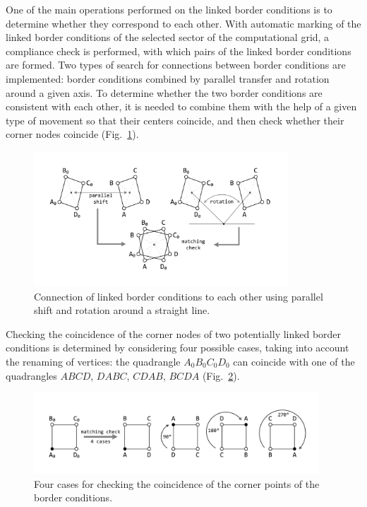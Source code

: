\documentclass[
11pt,%
tightenlines,%
twoside,%
onecolumn,%
nofloats,%
nobibnotes,%
nofootinbib,%
superscriptaddress,%
noshowpacs,%
centertags]%
{revtex4}
\begin{document}
One of the main operations performed on the linked border conditions
is to determine whether they correspond to each other. With
automatic marking of the linked border conditions of the selected
sector of the computational grid, a compliance check is performed,
with which pairs of the linked border conditions are formed. Two
types of search for connections between border conditions are
implemented: border conditions combined by parallel transfer and
rotation around a given axis. To determine whether the two border
conditions are consistent with each other, it is needed to combine
them with the help of a given type of movement so that their centers
coincide, and then check whether their corner nodes coincide
(Fig.~\ref{fig:match3}).

\begin{figure}[ht]
\setcaptionmargin{5mm}
\onelinecaptionsfalse
\includegraphics[width=0.85\textwidth]{pics/match3.pdf}
 \caption{Connection of linked border
conditions to each other  using parallel shift and rotation around a
straight line.} \label{fig:match3}
\end{figure}

Checking the coincidence of the corner nodes of two potentially
linked border conditions is determined by considering four possible
cases, taking into account the renaming of vertices: the quadrangle
$A_0B_0C_0D_0$ can coincide with one of the quadrangles $ABCD$,
$DABC$, $CDAB$, $BCDA$ (Fig.~\ref{fig:match}).

\begin{figure}[h]
\setcaptionmargin{5mm}
\onelinecaptionstrue
\includegraphics[width=0.95\textwidth]{pics/match.pdf}
\caption{Four cases for checking the
coincidence of the corner points of the border conditions.}
\label{fig:match}
\end{figure}
\end{document}
